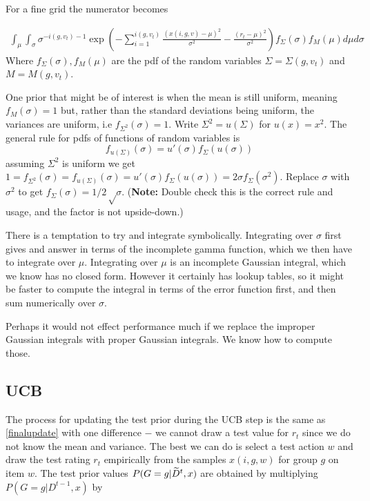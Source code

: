 \documentclass[12pt]{article}
\theoremstyle{definition}
\newcommand{\si}{\ensuremath{\sigma}}
\newcommand{\0}{\ensuremath{\varnothing}}
\newcommand{\wt}{\ensuremath{\widetilde}}
\newcommand{\1}{{\bf 1}}
\begin{document}
  For a fine grid the numerator becomes 
   
  
  \begin{align}   \int_{\mu} \int_{\si}    \si   ^{-i(g,v_t)-1}\exp \left( -\sum_{i=1}^{i(g,v_t)} \frac{(x(i,g,v) - \mu )^2}{\si^2 } - \frac{(r_t -   \mu )^2}{  \si^2  } \right)  f_\Sigma (\si) f_M(\mu )  d \mu  d \sigma  
  \end{align}
  Where $f_\Sigma (\si), f_M(\mu ) $ are the pdf of the random variables   $\Sigma = \Sigma(g,v_t) $ and $M =  M(g,v_t)$. %
  
  One   prior that might be of interest is when the mean is still uniform, meaning $f_M(\si) = 1$ but, rather than the standard deviations being uniform, the variances are uniform, i.e $f_{\Sigma^2}(\si)   = 1 $. Write $\Sigma^2 = u(\Sigma)$ for $u(x)=x^2$. The general rule for pdfs of functions of random variables is $$ f_{u(\Sigma)}(\sigma) = u'(\sigma) f_{\Sigma} (u (\sigma))$$
  assuming $\Sigma^2$ is uniform we get $1= f_{\Sigma^2}(\si)  =f_{u(\Sigma)}(\sigma) = u'(\sigma) f_{\Sigma} (u (\sigma)) = 2 \si f_\Sigma ( \si^2)$. Replace $\si$ with $\si^2$ to get $f_\Sigma ( \si) = 1/2\sqrt \si $. ({\bf Note:} Double check this is the correct rule and usage, and the factor is not upside-down.)
  
  
  
  
  There is a temptation to try and integrate symbolically. Integrating over $\si$ first gives and answer in terms of the incomplete gamma function, which we then have to integrate over $\mu$. Integrating over $\mu$ is an incomplete Gaussian integral, which we know has no closed form. However it certainly has lookup tables, so it might be faster to compute the integral in terms of the error function first, and then sum numerically over $\sigma$.
  
  Perhaps it would not effect performance much if we replace the improper Gaussian integrals with proper Gaussian integrals. We know how to compute those. 
   
  \subsection{UCB}
  
  The process for updating the test prior during the UCB step is the same as \eqref{finalupdate} with one difference $-$ we cannot draw a test value for $r_t$ since we do not know the mean and variance. The best we can do is select a test action $w$ and draw the test rating $r_{t}$ empirically from the samples $x(i,g,w)$ for group $g$ on item $w$. The test prior values $P(G=g | \wt D^t,x)$ are obtained by multiplying $P(G=g | D^{t-1},x)$ by 
  
\end{document}
